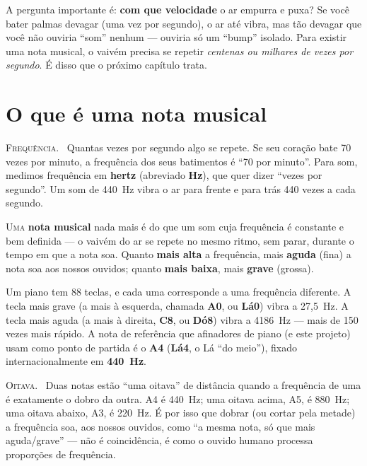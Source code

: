 \documentclass[11pt,oneside]{book}
\newcommand{\nova}[1]{\textsc{\color{accent}#1.}~}
\newcommand{\opening}[2]{\lettrine[lines=2,loversize=0.08,lraise=0.02]{#1}{#2}}
\begin{document}
A pergunta importante é: \textbf{com que velocidade} o ar empurra e puxa? Se
você bater palmas devagar (uma vez por segundo), o ar até vibra, mas tão
devagar que você não ouviria \enquote{som} nenhum --- ouviria só um
\enquote{bump} isolado. Para existir uma nota musical, o vaivém precisa se
repetir \emph{centenas ou milhares de vezes por segundo}. É disso que o
próximo capítulo trata.

\chapter{O que é uma nota musical}

\begin{newword}
\nova{Frequência} Quantas vezes por segundo algo se repete. Se seu coração
bate 70 vezes por minuto, a frequência dos seus batimentos é \enquote{70 por
minuto}. Para som, medimos frequência em \textbf{hertz} (abreviado
\textbf{Hz}), que quer dizer \enquote{vezes por segundo}. Um som de 440~Hz
vibra o ar para frente e para trás 440 vezes a cada segundo.
\end{newword}

\opening{U}{ma} \textbf{nota musical} nada mais é do que um som cuja
frequência é constante e bem definida --- o vaivém do ar se repete no mesmo
ritmo, sem parar, durante o tempo em que a nota soa. Quanto \textbf{mais
alta} a frequência, mais \textbf{aguda} (fina) a nota soa aos nossos
ouvidos; quanto \textbf{mais baixa}, mais \textbf{grave} (grossa).

Um piano tem 88 teclas, e cada uma corresponde a uma frequência diferente. A
tecla mais grave (a mais à esquerda, chamada \textbf{A0}, ou \textbf{Lá0})
vibra a 27,5~Hz. A tecla mais aguda (a mais à direita, \textbf{C8}, ou
\textbf{Dó8}) vibra a 4186~Hz --- mais de 150 vezes mais rápido. A nota de
referência que afinadores de piano (e este projeto) usam como ponto de
partida é o \textbf{A4} (\textbf{Lá4}, o Lá \enquote{do meio}), fixado
internacionalmente em \textbf{440~Hz}.

\begin{newword}
\nova{Oitava} Duas notas estão \enquote{uma oitava} de distância quando a
frequência de uma é exatamente o dobro da outra. A4 é 440~Hz; uma oitava
acima, A5, é 880~Hz; uma oitava abaixo, A3, é 220~Hz. É por isso que dobrar
(ou cortar pela metade) a frequência soa, aos nossos ouvidos, como \enquote{a
mesma nota, só que mais aguda/grave} --- não é coincidência, é como o
ouvido humano processa proporções de frequência.
\end{newword}
\end{document}
